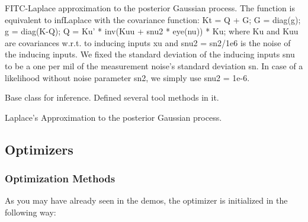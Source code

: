 \documentclass[letterpaper,10pt,english]{sphinxmanual}
\begin{document}

\begin{fulllineitems}
\label{Likelihoods:pyGPs.Core.inf.FITC_Laplace}
FITC-Laplace approximation to the posterior Gaussian process. The function is
equivalent to infLaplace with the covariance function:
Kt = Q + G; G = diag(g); g = diag(K-Q);  Q = Ku' * inv(Kuu + snu2 * eye(nu)) * Ku;
where Ku and Kuu are covariances w.r.t. to inducing inputs xu and
snu2 = sn2/1e6 is the noise of the inducing inputs. We fixed the standard
deviation of the inducing inputs snu to be a one per mil of the measurement 
noise's standard deviation sn. In case of a likelihood without noise
parameter sn2, we simply use snu2 = 1e-6.

\end{fulllineitems}


\begin{fulllineitems}
\label{Likelihoods:pyGPs.Core.inf.Inference}
Base class for inference. Defined several tool methods in it.

\end{fulllineitems}


\begin{fulllineitems}
\label{Likelihoods:pyGPs.Core.inf.Laplace}
Laplace's Approximation to the posterior Gaussian process.

\end{fulllineitems}



\subsection{Optimizers}
\label{Opts::doc}\label{Opts:optimizers}

\subsubsection{Optimization Methods}
\label{Opts:optimization-methods}
As you may have already seen in the demos, the optimizer is initialized in the following way:
\end{document}
